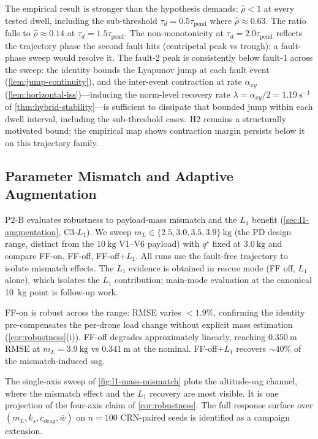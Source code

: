 \documentclass[lettersize,journal]{IEEEtran}
\begin{document}
The empirical result is stronger than the hypothesis demands: $\hat\rho < 1$ at every tested dwell, including the sub-threshold $\tau_d=0.5\tau_{\mathrm{pend}}$ where $\hat\rho\approx 0.63$. The ratio falls to $\hat\rho\approx 0.14$ at $\tau_d=1.5\tau_{\mathrm{pend}}$. The non-monotonicity at $\tau_d=2.0\tau_{\mathrm{pend}}$ reflects the trajectory phase the second fault hits (centripetal peak vs trough); a fault-phase sweep would resolve it. The fault-2 peak is consistently below fault-1 across the sweep: the identity bounds the Lyapunov jump at each fault event (\cref{lem:jump-continuity}), and the inter-event contraction at rate $\alpha_{xy}$ (\cref{lem:horizontal-iss})---inducing the norm-level recovery rate $\lambda = \alpha_{xy}/2 = \SI{1.19}{\second^{-1}}$ of \cref{thm:hybrid-stability}---is sufficient to dissipate that bounded jump within each dwell interval, including the sub-threshold cases. H2 remains a structurally motivated bound; the empirical map shows contraction margin persists below it on this trajectory family.

\subsection{Parameter Mismatch and Adaptive Augmentation}
\label{sec:VI-E}

P2-B evaluates robustness to payload-mass mismatch and the $L_1$ benefit (\cref{sec:l1-augmentation}, C3-$L_1$). We sweep $m_L \in \{2.5, 3.0, 3.5, 3.9\}~\si{\kilo\gram}$ (the PD design range, distinct from the $\SI{10}{\kilo\gram}$ V1--V6 payload) with $q^\star$ fixed at $\SI{3.0}{\kilo\gram}$ and compare FF-on, FF-off, FF-off$+L_1$. All runs use the fault-free trajectory to isolate mismatch effects. The $L_1$ evidence is obtained in rescue mode (FF off, $L_1$ alone), which isolates the $L_1$ contribution; main-mode evaluation at the canonical \SI{10}{\kilo\gram} point is follow-up work.

FF-on is robust across the range: RMSE varies $<1.9\%$, confirming the identity pre-compensates the per-drone load change without explicit mass estimation (\cref{cor:robustness}(i)). FF-off degrades approximately linearly, reaching $\SI{0.350}{\metre}$ RMSE at $m_L = \SI{3.9}{\kilo\gram}$ vs $\SI{0.341}{\metre}$ at the nominal. FF-off$+L_1$ recovers $\sim 40\%$ of the mismatch-induced sag.

The single-axis sweep of \cref{fig:l1-mass-mismatch} plots the altitude-sag channel, where the mismatch effect and the $L_1$ recovery are most visible. It is one projection of the four-axis claim of \cref{cor:robustness}. The full response surface over $(m_L, k_s, c_{\mathrm{drag}}, \bar{w})$ on $n=100$ CRN-paired seeds is identified as a campaign extension.
\end{document}
